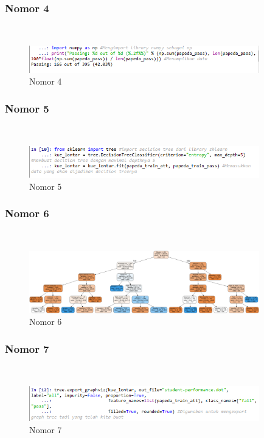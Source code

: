 \subsubsection{Nomor 4}
\hfill\\

\begin{figure}[H]
\centerline{\includegraphics[width=10cm]{figures/1174077/2/p4.png}}
\caption{Nomor 4}
\label{labelgambar}
\end{figure}

\subsubsection{Nomor 5}
\hfill\\

\begin{figure}[H]
\centerline{\includegraphics[width=10cm]{figures/1174077/2/p5.png}}
\caption{Nomor 5}
\label{labelgambar}
\end{figure}

\subsubsection{Nomor 6}
\hfill\\

\begin{figure}[H]
\centerline{\includegraphics[width=10cm]{figures/1174077/2/p6.png}}
\caption{Nomor 6}
\label{labelgambar}
\end{figure}

\subsubsection{Nomor 7}
\hfill\\

\begin{figure}[H]
\centerline{\includegraphics[width=10cm]{figures/1174077/2/p7.png}}
\caption{Nomor 7}
\label{labelgambar}
\end{figure}

